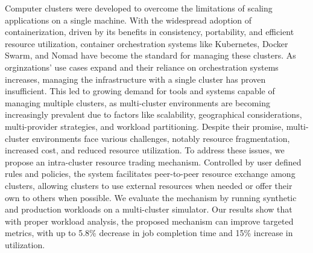 Computer clusters were developed to overcome the limitations of scaling
applications on a single machine. With the widespread adoption of
containerization, driven by its benefits in consistency, portability, and
efficient resource utilization, container orchestration systems like
Kubernetes, Docker Swarm, and Nomad have become the standard for managing these
clusters. As orginzations' use cases expand and their reliance on orchestration
systems increases, managing the infrastructure with a single cluster has proven
insufficient. This led to growing demand for tools and systems capable of
managing multiple clusters, as multi-cluster environments are becoming
increasingly prevalent due to factors like scalability, geographical
considerations, multi-provider strategies, and workload partitioning. Despite
their promise, multi-cluster environments face various challenges, notably
resource fragmentation, increased cost, and reduced resource utilization. To
address these issues, we propose an intra-cluster resource trading mechanism.
Controlled by user defined rules and policies, the system facilitates
peer-to-peer resource exchange among clusters, allowing clusters to use
external resources when needed or offer their own to others when possible. We
evaluate the mechanism by running synthetic and production workloads on a
multi-cluster simulator. Our results show that with proper workload analysis,
the proposed mechanism can improve targeted metrics, with up to 5.8\% decrease
in job completion time and 15\% increase in utilization. 
